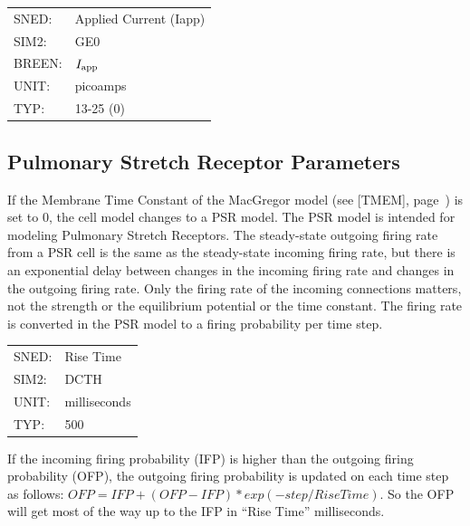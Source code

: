 \documentclass[12pt,openany,oneside]{book}
\newcommand{\tipxref}[1]{see [#1], page~\pageref{#1}}
\begin{document}
\begin{flushleft}
\begin{tabular}{@{}ll@{}}
SNED: & Applied Current (Iapp)\\
SIM2: & GE0\\
BREEN: & $I_{\rm app}$\\
UNIT: & picoamps\\
TYP: & 13-25 (0)\\
\end{tabular}
\end{flushleft}
\noindent
\filbreak
\vspace{\baselineskip}

\subsection{Pulmonary Stretch Receptor Parameters}
\label{PSR Parameters}

If the Membrane Time Constant of the MacGregor model (\tipxref{TMEM}) is
set to 0, the cell model changes to a PSR model.  The PSR model is
intended for modeling Pulmonary Stretch Receptors.  The steady-state
outgoing firing rate from a PSR cell is the same as the steady-state
incoming firing rate, but there is an exponential delay between
changes in the incoming firing rate and changes in the outgoing firing
rate.  Only the firing rate of the incoming connections matters, not
the strength or the equilibrium potential or the time constant.  The
firing rate is converted in the PSR model to a firing probability per
time step.

\begin{flushleft}
\begin{tabular}{@{}ll@{}}
SNED: & Rise Time\\
SIM2: & DCTH\\
UNIT: & milliseconds\\
TYP: & 500\\
\end{tabular}
\end{flushleft}
\noindent
If the incoming firing probability (IFP) is higher than the outgoing
firing probability (OFP), the outgoing firing probability is updated
on each time step as follows: $OFP = IFP + (OFP - IFP) * exp
(-step / RiseTime)$.  So the OFP will get most of the way up to the
IFP in ``Rise Time'' milliseconds.
\filbreak
\vspace{\baselineskip}
\end{document}
